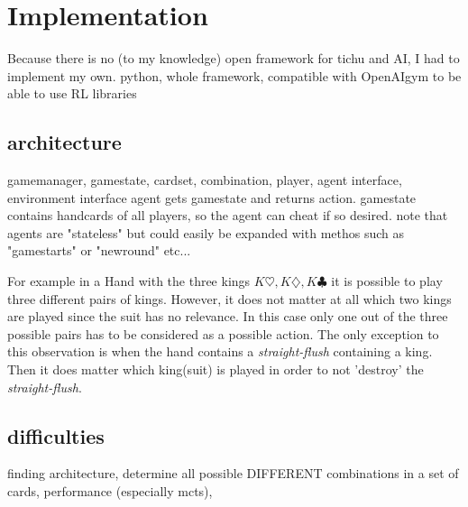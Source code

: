 \chapter{Implementation}
\label{ch:impl}
Because there is no (to my knowledge) open framework for tichu and AI, I had to implement my own.
python, whole framework, compatible with OpenAIgym to be able to use RL libraries


\section{architecture}
gamemanager, gamestate, cardset, combination, player, agent interface, environment interface
agent gets gamestate and returns action. gamestate contains handcards of all players, so the agent can cheat if so desired.
note that agents are "stateless" but could easily be expanded with methos such as "gamestarts" or "newround" etc...

For example in a Hand with the three kings $K\heartsuit, K\diamondsuit, K\clubsuit$ it is possible to play three different pairs of kings. However, it does not matter at all which two kings are played since the suit has no relevance. In this case only one out of the three possible pairs has to be considered as a possible action.\newline
The only exception to this observation is when the hand contains a \textit{straight-flush} containing a king. Then it does matter which king(suit) is played in order to not 'destroy' the \textit{straight-flush}.


\section{difficulties}
finding architecture, determine all possible DIFFERENT combinations in a set of cards, performance (especially mcts),
